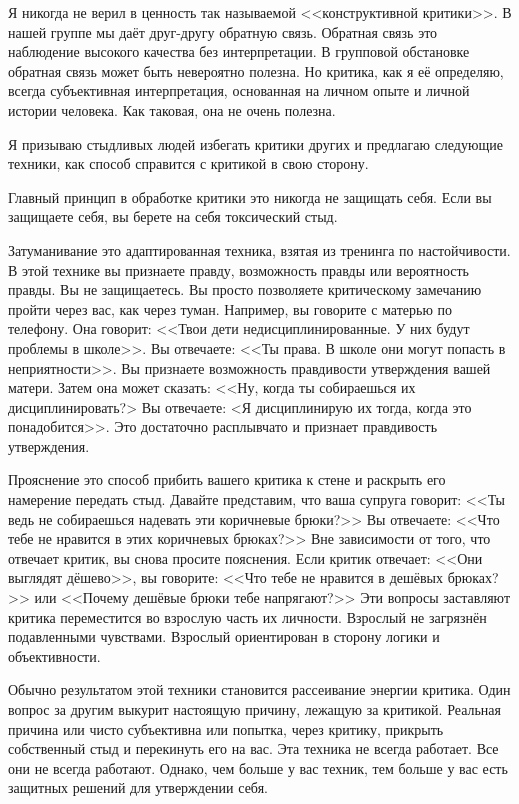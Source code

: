 \documentclass[10pt, fleqn]{article}
\begin{document}
Я никогда не верил в ценность так называемой <<конструктивной критики>>. В нашей группе мы даёт друг-другу обратную связь. Обратная связь это наблюдение высокого качества без интерпретации. В групповой обстановке обратная связь может быть невероятно полезна. Но критика, как я её определяю, всегда субъективная интерпретация, основанная на личном опыте и личной истории человека. Как таковая, она не очень полезна.

Я призываю стыдливых людей избегать критики других и предлагаю следующие техники, как способ справится с критикой в свою сторону.

Главный принцип в обработке критики это никогда не защищать себя. Если вы защищаете себя, вы берете на себя токсический стыд.


Затуманивание это адаптированная техника, взятая из тренинга по настойчивости. В этой технике вы признаете правду, возможность правды или вероятность правды. Вы не защищаетесь. Вы просто позволяете критическому замечанию пройти через вас, как через туман. Например, вы говорите с матерью по телефону. Она говорит: <<Твои дети недисциплинированные. У них будут проблемы в школе>>. Вы отвечаете: <<Ты права. В школе они могут попасть в неприятности>>. Вы признаете возможность правдивости утверждения вашей матери. Затем она может сказать: <<Ну, когда ты собираешься их дисциплинировать?> Вы отвечаете: <Я дисциплинирую их тогда, когда это понадобится>>. Это достаточно расплывчато и признает правдивость утверждения.


Прояснение это способ прибить вашего критика к стене и раскрыть его намерение передать стыд. Давайте представим, что ваша супруга говорит: <<Ты ведь не собираешься надевать эти коричневые брюки?>> Вы отвечаете: <<Что тебе не нравится в этих коричневых брюках?>> Вне зависимости от того, что отвечает критик, вы снова просите пояснения. Если критик отвечает: <<Они выглядят дёшево>>, вы говорите: <<Что тебе не нравится в дешёвых брюках?>> или <<Почему дешёвые брюки тебе напрягают?>> Эти вопросы заставляют критика переместится во взрослую часть их личности. Взрослый не загрязнён подавленными чувствами. Взрослый ориентирован в сторону логики и объективности.

Обычно результатом этой техники становится рассеивание энергии критика. Один вопрос за другим выкурит настоящую причину, лежащую за критикой. Реальная причина или чисто субъективна или попытка, через критику, прикрыть собственный стыд и перекинуть его на вас. Эта техника не всегда работает. Все они не всегда работают. Однако, чем больше у вас техник, тем больше у вас есть защитных решений для утверждении себя.
\end{document}
